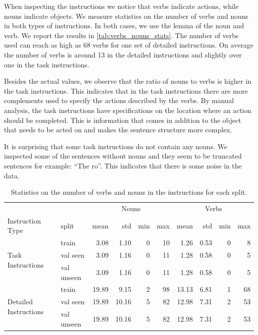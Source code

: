 \documentclass[11pt,a4paper]{article}
\begin{document}
When inspecting the instructions we notice that verbs indicate actions, while nouns indicate objects. We measure statistics on the number of verbs and nouns in both types of instructions. In both cases, we use the lemma of the noun and verb. We report the results in \autoref{tab:verbs_nouns_stats}. The number of verbs used can reach as high as 68 verbs  for one set of detailed instructions. On average the number of verbs is around 13 in the detailed instructions and slightly over one in the task instructions. 

Besides the actual values, we observe that the ratio of nouns to verbs is higher in the task instructions. This indicates that in the task instructions there are more complements used to specify the actions described by the verbs. By manual analysis, the task instructions have specifications on the location where an action should be completed. This is information that comes in addition to the object that needs to be acted on and makes the sentence structure more complex. 

It is surprising that some task instructions do not contain any nouns. We inspected some of the sentences without nouns and they seem to be truncated sentences for example: ``The ro''. This indicates that there is some noise in the data.


\begin{table}[]
    \centering
\begin{tabular}{llrrrr|rrrr}
\toprule
        & & \multicolumn{4}{c|}{Nouns} & \multicolumn{4}{c}{Verbs}\\
    Instruction Type & split &  mean &  std &  min &  max &  mean &  std &  min &  max \\
\midrule
\multirow{3}{*}{Task Instructions}
&      train &  3.08 & 1.10 &    0 &   10 &  1.26 & 0.53 &    0 &    8 \\
&   val seen &  3.09 & 1.16 &    0 &   11 &  1.28 & 0.58 &    0 &    5 \\
& val unseen &  3.09 & 1.16 &    0 &   11 &  1.28 & 0.58 &    0 &    5 \\
\midrule
\multirow{3}{*}{Detailed Instructions}
&      train & 19.89 &  9.15 &    2 &   98 & 13.13 & 6.81 &    1 &   68 \\
&   val seen & 19.89 & 10.16 &    5 &   82  & 12.98 & 7.31 &    2 &   53 \\
& val unseen & 19.89 & 10.16 &    5 &   82  & 12.98 & 7.31 &    2 &   53 \\
\bottomrule
\end{tabular}
    \caption{Statistics on the number of verbs and nouns in the instructions for each split.}
    \label{tab:verbs_nouns_stats}
\end{table}
\end{document}
